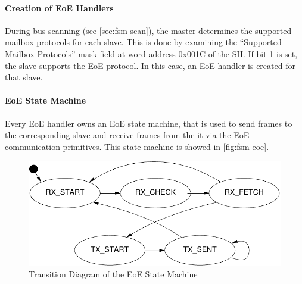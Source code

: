 \documentclass[a4paper,12pt,BCOR6mm,bibtotoc,idxtotoc]{scrbook}
\begin{document}
\paragraph{Creation of EoE Handlers}

During bus scanning (see \autoref{sec:fsm-scan}), the master determines the
supported mailbox protocols for each slave. This is done by examining the
``Supported Mailbox Protocols'' mask field at word address 0x001C of the
SII. If bit 1 is set, the slave supports the EoE protocol. In this
case, an EoE handler is created for that slave.

\paragraph{EoE State Machine}

Every EoE handler owns an EoE state machine, that is used to send frames to
the corresponding slave and receive frames from the it via the EoE
communication primitives. This state machine is showed in
\autoref{fig:fsm-eoe}.

\begin{figure}[htbp]
  \centering
  \includegraphics[width=.7\textwidth]{images/fsm-eoe} %
  \caption{Transition Diagram of the EoE State Machine}
  \label{fig:fsm-eoe}
\end{figure}

\end{document}

